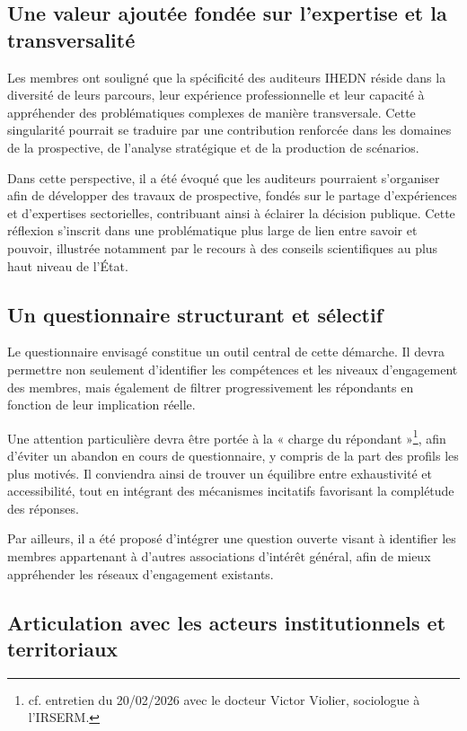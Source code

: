 \documentclass[12pt,a4paper]{article}
\begin{document}
\subsection{Une valeur ajoutée fondée sur l'expertise et la transversalité}

Les membres ont souligné que la spécificité des auditeurs IHEDN réside dans la diversité de leurs parcours, leur expérience professionnelle et leur capacité à appréhender des problématiques complexes de manière transversale. Cette singularité pourrait se traduire par une contribution renforcée dans les domaines de la prospective, de l'analyse stratégique et de la production de scénarios.

Dans cette perspective, il a été évoqué que les auditeurs pourraient s'organiser afin de développer des travaux de prospective, fondés sur le partage d'expériences et d'expertises sectorielles, contribuant ainsi à éclairer la décision publique. Cette réflexion s'inscrit dans une problématique plus large de lien entre savoir et pouvoir, illustrée notamment par le recours à des conseils scientifiques au plus haut niveau de l'État.

\subsection{Un questionnaire structurant et sélectif}

Le questionnaire envisagé constitue un outil central de cette démarche. Il devra permettre non seulement d'identifier les compétences et les niveaux d'engagement des membres, mais également de filtrer progressivement les répondants en fonction de leur implication réelle.

Une attention particulière devra être portée à la « charge du répondant »\footnote{cf. entretien du 20/02/2026 avec le docteur Victor Violier, sociologue à l'IRSERM.}, afin d'éviter un abandon en cours de questionnaire, y compris de la part des profils les plus motivés. Il conviendra ainsi de trouver un équilibre entre exhaustivité et accessibilité, tout en intégrant des mécanismes incitatifs favorisant la complétude des réponses.

Par ailleurs, il a été proposé d'intégrer une question ouverte visant à identifier les membres appartenant à d'autres associations d'intérêt général, afin de mieux appréhender les réseaux d'engagement existants.

\subsection{Articulation avec les acteurs institutionnels et territoriaux}
\end{document}
